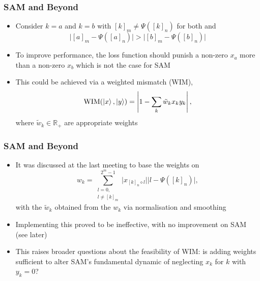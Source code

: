 \documentclass{beamer}
\begin{document}
\begin{frame}
\frametitle{SAM and Beyond}
\begin{itemize}
\item Consider $k=a$ and $k=b$ with $[k]_m \neq \Psi([k]_n)$ for both and 
\begin{equation}
\Big|[a]_m - \Psi([a]_n) \Big| > \Big|[b]_m - \Psi([b]_n) \Big| 
\end{equation}
\item To improve performance, the loss function should punish a non-zero $x_a$ more than a non-zero $x_b$ which is not the case for SAM
\item This could be achieved via a \alert{weighted mismatch (WIM)}, 
\begin{equation}
\text{WIM}(\ket{x}, \ket{y}) = \left\vert 1 - \sum_k \tilde{w}_k x_k y_k \right\vert, 
\end{equation}
where $\tilde{w}_k \in \mathbb{R}_+$ are appropriate weights
\end{itemize}
\end{frame}

\begin{frame}
\frametitle{SAM and Beyond}
\begin{itemize}
\item It was discussed at the last meeting to base the weights on
\begin{equation}
w_k = \sum^{2^m -1}_{\substack{l=0, \\ l \neq [k]_m}} \Big|x_{[k]_n \diamond l} \Big| \Big| l - \Psi([k]_n) \Big|,
\end{equation}
with the $\tilde{w}_k$ obtained from the $w_k$ via normalisation and smoothing
\item Implementing this \alert{proved to be ineffective}, with no improvement on SAM  (see later)
\item This raises broader questions about the \alert{feasibility of WIM}: is adding weights sufficient to alter SAM's fundamental dynamic of neglecting $x_k$ for $k$ with $y_k =0$?
\end{itemize}
\end{frame}
\end{document}
